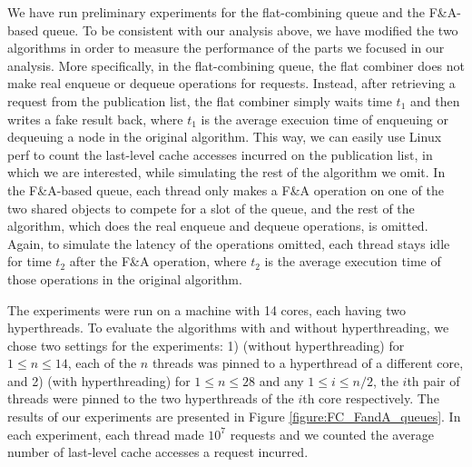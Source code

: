 We have run preliminary experiments for the flat-combining queue and the F\&A-based queue. 
To be consistent with our analysis above, we have modified the two algorithms in order to 
measure the performance of the parts we focused in our analysis.  
More specifically, in the flat-combining queue, the flat combiner does not make 
real enqueue or dequeue operations for requests. 
Instead, after retrieving a request from the publication list, 
the flat combiner simply waits time $t_1$ and then writes a fake result back, 
where $t_1$ is the average execuion time of enqueuing or dequeuing a node in the original algorithm. 
This way, we can easily use Linux perf to count the last-level cache accesses incurred 
on the publication list, in which we are interested, while simulating the rest of the algorithm we omit. 
In the F\&A-based queue, each thread only makes a F\&A operation on one of the two shared objects 
to compete for a slot of the queue, and the rest of the algorithm, 
which does the real enqueue and dequeue operations, is omitted. 
Again, to simulate the latency of the operations omitted, each thread stays idle for time $t_2$ after 
the F\&A operation, where $t_2$ is the average execution time of those operations in the original algorithm.


The experiments were run on a machine with 14 cores, each having two hyperthreads. 
To evaluate the algorithms with and without hyperthreading, we chose two settings for the experiments: 
1) (without hyperthreading) for $1 \le n \le 14$, 
each of the $n$ threads was pinned to a hyperthread of a different core, and
2) (with hyperthreading) for $1 \le n \le 28$ and any $1\le i \le n/2$, 
the $i$th pair of threads were pinned to the two hyperthreads of the $i$th core respectively. 
The results of our experiments are presented in Figure \ref{figure:FC_FandA_queues}. 
In each experiment, each thread made $10^7$ requests and we counted the average number of last-level cache 
accesses a request incurred. 


